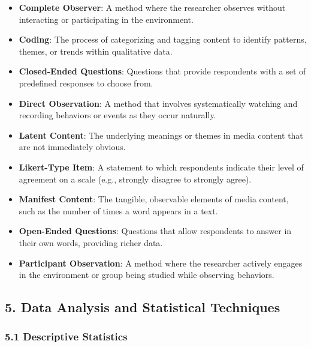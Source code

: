 \documentclass[
]{book}
\providecommand{\tightlist}{%
  \setlength{\itemsep}{0pt}\setlength{\parskip}{0pt}}
\begin{document}
\begin{itemize}
\tightlist
\item
  \textbf{Complete Observer}: A method where the researcher observes without interacting or participating in the environment.
\item
  \textbf{Coding}: The process of categorizing and tagging content to identify patterns, themes, or trends within qualitative data.
\item
  \textbf{Closed-Ended Questions}: Questions that provide respondents with a set of predefined responses to choose from.
\item
  \textbf{Direct Observation}: A method that involves systematically watching and recording behaviors or events as they occur naturally.
\item
  \textbf{Latent Content}: The underlying meanings or themes in media content that are not immediately obvious.
\item
  \textbf{Likert-Type Item}: A statement to which respondents indicate their level of agreement on a scale (e.g., strongly disagree to strongly agree).
\item
  \textbf{Manifest Content}: The tangible, observable elements of media content, such as the number of times a word appears in a text.
\item
  \textbf{Open-Ended Questions}: Questions that allow respondents to answer in their own words, providing richer data.
\item
  \textbf{Participant Observation}: A method where the researcher actively engages in the environment or group being studied while observing behaviors.
\end{itemize}

\subsection*{\texorpdfstring{5. \textbf{Data Analysis and Statistical Techniques}}{5. Data Analysis and Statistical Techniques}}\label{data-analysis-and-statistical-techniques-1}

\subsubsection*{\texorpdfstring{\textbf{5.1 Descriptive Statistics}}{5.1 Descriptive Statistics}}\label{descriptive-statistics-1}
\end{document}
